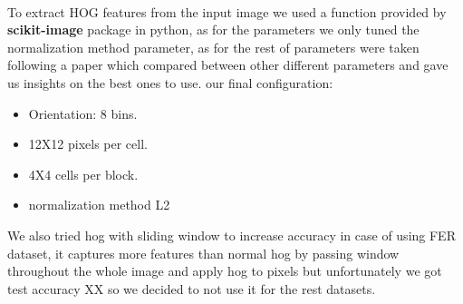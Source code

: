 \paragraph{}
To extract HOG features from the input image we used a function provided by \textbf{scikit-image} package in python, as for the parameters we only tuned the normalization method parameter, as for the rest of parameters were taken following a paper\cite{hog} which compared between other different parameters and gave us insights on the best ones to use.\newline 
our final configuration:
\begin{itemize}[noitemsep]
\item Orientation: 8 bins. 
\item 12X12 pixels per cell. 
\item 4X4 cells per block.
\item normalization method L2
\end{itemize}

We also tried hog with sliding window to increase accuracy in case of using FER dataset, it captures more features than normal hog by passing window throughout the whole image and apply hog to pixels but unfortunately we got test accuracy XX so we decided to not use it for the rest datasets.

